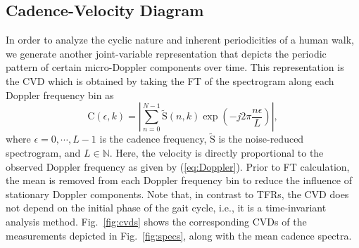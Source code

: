 \subsection{Cadence-Velocity Diagram}
In order to analyze the cyclic nature and inherent periodicities of a human walk, we generate another joint-variable representation that depicts the periodic pattern of certain micro-Doppler components over time. 
This representation is the CVD which is obtained by taking the FT of the spectrogram along each Doppler frequency bin as \cite{Cle15}
\begin{equation}%
\mathrm{C}(\epsilon,k)  = \left| \sum_{n=0}^{N-1} \tilde{\mathrm{S}}(n,k\textbf{}) \exp{\left(-j 2 \pi \frac{n \epsilon}{L}\right)} \right|, 
\label{eq:CVD}
\end{equation}
where $\epsilon = 0, \cdots, L-1$ is the cadence frequency, $\tilde{\mathrm{S}}$ is the noise-reduced spectrogram, and $L \in \mathbb{N}$. Here, the velocity is directly proportional to the observed Doppler frequency as given by (\ref{eq:Doppler}). Prior to FT calculation, the mean is removed from each Doppler frequency bin to reduce the influence of stationary Doppler components. Note that, in contrast to TFRs, the CVD does not depend on the initial phase of the gait cycle, i.e., it is a time-invariant analysis method. Fig.~\ref{fig:cvds} shows the corresponding CVDs of the measurements depicted in Fig.~\ref{fig:specs}, along with the mean cadence spectra.


